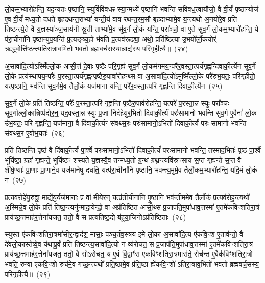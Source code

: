 लो॒कम॒भ्यारो॑हन्ति॒ यद॒न्यतः॑ पृ॒ष्ठानि॒ स्युर्विवि॑वधꣴ स्या॒न्मध्ये॑ पृ॒ष्ठानि॑ भवन्ति सविवध॒त्वायौजो॒ वै वी॒र्यं॑ पृ॒ष्ठान्योज॑ ए॒व वी॒र्यं॑ मध्य॒तो द॑धते बृहद्रथन्त॒रा\-भ्यां᳚ यन्ती॒यं वाव र॑थन्त॒रम॒सौ बृ॒हदाभ्यामे॒व य॒न्त्यथो॑ अ॒नयो॑रे॒व प्रति॑ तिष्ठन्त्ये॒ते वै य॒ज्ञस्या᳚ञ्ज॒साय॑नी स्रु॒ती ताभ्या॑मे॒व सु॑व॒र्गं लो॒कं य॑न्ति॒ परा᳚ञ्चो॒ वा ए॒ते सु॑व॒र्गं लो॒कम॒भ्यारो॑हन्ति॒ ये प॑रा॒चीना॑नि पृ॒ष्ठान्यु॑प॒यन्ति॑ प्र॒त्यङ्त्र्य॒हो भ॑वति प्र॒त्यव॑रूढ्या॒ अथो॒ प्रति॑ष्ठित्या उ॒भयो᳚र्लो॒कयोर्॑ ऋ॒द्ध्वोत्ति॑ष्ठन्त्यतिरा॒त्राव॒भितो॑ भवतो ब्रह्मवर्च॒सस्या॒न्नाद्य॑स्य॒ परि॑गृहीत्यै॥~(२४)\ip

{\anuvakamend[{वृ॒ञ्ज॒ते॒ ब्रह्म॒ चान्न॑ञ्च सुव॒र्गमे॒ते सु॑व॒र्गन्त्रयो॑विꣳशतिश्च}]}

अ॒सावा॑दि॒त्यो᳚\-ऽस्मिँल्लो॒क आ॑सी॒त्तं दे॒वाः पृ॒ष्ठैः प॑रि॒गृह्य॑ सुव॒र्गं लो॒कम॑गमय॒न्परै॑र॒वस्ता॒त्पर्य॑गृह्णन्दिवाकी॒र्त्ये॑न सुव॒र्गे लो॒के प्रत्य॑स्थापय॒न्परैः᳚ प॒रस्ता॒त्पर्य॑गृह्णन्पृ॒ष्ठैरु॒पावा॑रोह॒न्थ्स वा अ॒सावा॑दि॒त्यो॑\-ऽमुष्मिँ॑ल्लो॒के परै॑रुभ॒यतः॒ परि॑गृहीतो॒ यत्पृ॒ष्ठानि॒ भव॑न्ति सुव॒र्गमे॒व तैर्लो॒कं यज॑माना यन्ति॒ परै॑र॒वस्ता॒त्परि॑ गृह्णन्ति दिवाकी॒र्त्ये॑न~(२५)\ip

सु॒व॒र्गे लो॒के प्रति॑ तिष्ठन्ति॒ परैः᳚ प॒रस्ता॒त्परि॑ गृह्णन्ति पृ॒ष्ठैरु॒पाव॑रोहन्ति॒ यत्परे॑ प॒रस्ता॒न्न स्युः परा᳚ञ्चः सुव॒र्गाल्लो॒कान्निष्प॑द्येर॒न्॒ यद॒वस्ता॒न्न स्युः प्र॒जा निर्द॑हेयुर॒भितो॑ दिवाकी॒र्त्यं॑ परः॑सामानो भवन्ति सुव॒र्ग ए॒वैनां᳚ लो॒क उ॑भ॒यतः॒ परि॑ गृह्णन्ति॒ यज॑माना॒ वै दि॑वाकी॒र्त्यꣳ॑ संवथ्स॒रः परः॑सामानो॒\-ऽभितो॑ दिवाकी॒र्त्यं॑ परः॑ सामानो भवन्ति संवथ्स॒र ए॒वोभ॒यतः॑~(२६)\ip

प्रति॑ तिष्ठन्ति पृ॒ष्ठं वै दि॑वाकी॒र्त्यं॑ पा॒र्श्वे परः॑सामानो॒\-ऽभितो॑ दिवाकी॒र्त्यं॑ परः॑सामानो भवन्ति॒ तस्मा॑द॒भितः॑ पृ॒ष्ठं पा॒र्श्वे भूयि॑ष्ठा॒ ग्रहा॑ गृह्यन्ते॒ भूयि॑ष्ठꣳ शस्यते य॒ज्ञस्यै॒व तन्म॑ध्य॒तो ग्र॒न्थं ग्र॑थ्न॒न्त्यवि॑स्रꣳसाय स॒प्त गृ॑ह्यन्ते स॒प्त वै शी॑र्\mbox{}ष॒ण्याः᳚ प्रा॒णाः प्रा॒णाने॒व यज॑मानेषु दधति॒ यत्प॑रा॒चीना॑नि पृ॒ष्ठानि॒ भव॑न्त्य॒मुमे॒व तैर्लो॒कम॒भ्यारो॑हन्ति॒ यदि॒मं लो॒कं न~(२७)\ip

प्र॒त्य॒व॒रोहे॑यु॒रुद्वा॒ माद्ये॑यु॒र्यज॑मानाः॒ प्र वा॑ मीयेर॒न्॒ यत्प्र॑ती॒चीना॑नि पृ॒ष्ठानि॒ भव॑न्ती॒ममे॒व तैर्लो॒कं प्र॒त्यव॑रोह॒न्त्यथो॑ अ॒स्मिन्ने॒व लो॒के प्रति॑ तिष्ठ॒न्त्यनु॑न्मादा॒येन्द्रो॒ वा अप्र॑तिष्ठित आसी॒थ्स प्र॒जा\-प॑ति॒मुपा॑धाव॒त्तस्मा॑ ए॒तमे॑कविꣳशतिरा॒त्रं प्राय॑च्छ॒त्तमाह॑र॒त्तेना॑यजत॒ ततो॒ वै स प्रत्य॑तिष्ठ॒द्ये ब॑हुया॒जिनो\-ऽप्र॑तिष्ठिताः~(२८)\ip

स्युस्त ए॑कविꣳशतिरा॒त्रमा॑सीर॒न्द्वाद॑श॒ मासाः॒ पञ्च॒र्तव॒स्त्रय॑ इ॒मे लो॒का अ॒सावा॑दि॒त्य ए॑कवि॒ꣳ॒श ए॒ताव॑न्तो॒ वै दे॑वलो॒कास्तेष्वे॒व य॑थापू॒र्वं प्रति॑ तिष्ठन्त्य॒सावा॑दि॒त्यो न व्य॑रोचत॒ स प्र॒जा\-प॑ति॒मुपा॑धाव॒त्तस्मा॑ ए॒तमे॑कविꣳशति\-रा॒त्रं प्राय॑च्छ॒त्तमाह॑र॒त्तेना॑यजत॒ ततो॒ वै सो॑\-ऽरोचत॒ य ए॒वं वि॒द्वाꣳ॑स एकविꣳशतिरा॒त्रमास॑ते॒ रोच॑न्त ए॒वैक॑विꣳशतिरा॒त्रो भ॑वति॒ रुग्वा ए॑कवि॒ꣳ॒शो रुच॑मे॒व ग॑च्छ॒न्त्यथो᳚ प्रति॒ष्ठामे॒व प्र॑ति॒ष्ठा ह्ये॑कवि॒ꣳ॒शो॑-\-ऽतिरा॒त्राव॒भितो॑ भवतो ब्रह्मवर्च॒सस्य॒ परि॑गृहीत्यै॥~(२९)\ip

